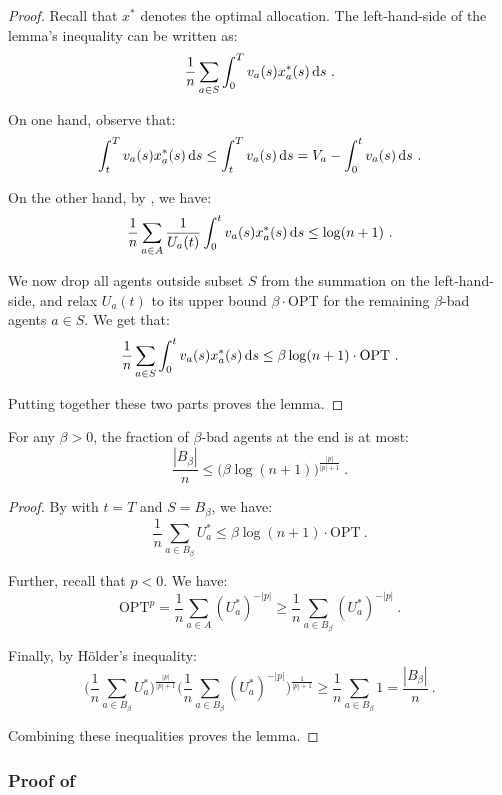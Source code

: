 \documentclass[11pt,letterpaper]{article}
\newcommand{\OPT}{\mathrm{OPT}}
\newcommand{\dif}[1]{\,\text{\rm d} #1}
\newcommand{\utility}{U}
\begin{document}
\begin{proof}
	Recall that $x^*$ denotes the optimal allocation.
	The left-hand-side of the lemma's inequality can be written as:
	\[
	\frac{1}{n} \sum_{a \in S} \int_0^T v_a(s) x^*_a(s) \dif{s}
	~.
	\]
	
	On one hand, observe that:
	\[
	\int_t^T v_a(s) x^*_a(s) \dif{s} \le \int_t^T v_a(s) \dif{s} = V_a - \int_0^t v_a(s) \dif{s}
	~.
	\]
	
	On the other hand, by , we have:
	\[
	\frac{1}{n} \sum_{a \in A} \frac{1}{\utility_a(t)} \int_0^t v_a(s) x^*_a(s) \dif{s} \le \log(n+1) 
	~.
	\]
	
	We now drop all agents outside subset $S$ from the summation on the left-hand-side, and relax $\utility_a(t)$ to its upper bound $\beta \cdot \OPT$ for the remaining $\beta$-bad agents $a \in S$.
	We get that:
	\[
	\frac{1}{n} \sum_{a \in S} \int_0^t v_a(s) x^*_a(s) \dif{s} \le \beta \log (n+1) \cdot \OPT
	~.
	\]	
	
	Putting together these two parts proves the lemma.
\end{proof}

\begin{lemma}
	\label{lem:bad-agents-number-app}
	For any $\beta > 0$, the fraction of $\beta$-bad agents at the end is at most:
	\[
	\frac{|B_\beta|}{n} \le \big( \beta \log (n+1) \big)^{\frac{|p|}{|p|+1}}
	~.
	\]
\end{lemma}

\begin{proof}
	By  with $t = T$ and $S = B_\beta$, we have:
	\[
	\frac{1}{n} \sum_{a \in B_\beta} \utility_a^* \leq \beta \log (n+1) \cdot \OPT
	~.
	\]	
	
	Further, recall that $p < 0$.
	We have:
	\[
	\OPT^p = \frac{1}{n} \sum_{a \in A} (\utility_a^*)^{-|p|} \ge \frac{1}{n} \sum_{a \in B_\beta} (\utility_a^*)^{-|p|} 
	~.
	\]
	
	Finally, by H\"{o}lder's inequality:
	\[
	\bigg( \frac{1}{n} \sum_{a \in B_\beta} \utility_a^* \bigg)^{\frac{|p|}{|p|+1}} 
	\bigg( \frac{1}{n} \sum_{a \in B_\beta} (\utility_a^*)^{-|p|} \bigg)^{\frac{1}{|p|+1}} \ge \frac{1}{n} \sum_{a \in B_\beta} 1 = \frac{|B_\beta|}{n}
	~.
	\]
	
	Combining these inequalities proves the lemma.
\end{proof}



\subsubsection{Proof of }
\end{document}
